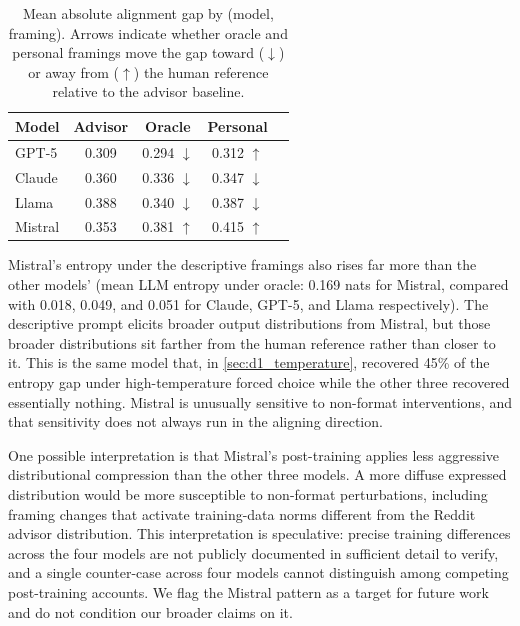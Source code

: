 \begin{table}[t]
  \centering
  \caption{Mean absolute alignment gap by (model, framing). Arrows
    indicate whether oracle and personal framings move the gap toward
    ($\downarrow$) or away from ($\uparrow$) the human reference
    relative to the advisor baseline.}
  \label{tab:d2_per_model}
  \begin{tabular}{lcccc}
    \toprule
    Model   & Advisor & Oracle             & Personal           \\
    \midrule
    GPT-5   & 0.309   & 0.294 $\downarrow$ & 0.312 $\uparrow$   \\
    Claude  & 0.360   & 0.336 $\downarrow$ & 0.347 $\downarrow$ \\
    Llama   & 0.388   & 0.340 $\downarrow$ & 0.387 $\downarrow$ \\
    Mistral & 0.353   & 0.381 $\uparrow$   & 0.415 $\uparrow$   \\
    \bottomrule
  \end{tabular}
\end{table}

Mistral's entropy under the descriptive framings also rises far more
than the other models' (mean LLM entropy under oracle: 0.169 nats for
Mistral, compared with 0.018, 0.049, and 0.051 for Claude, GPT-5, and
Llama respectively). The descriptive prompt elicits broader output
distributions from Mistral, but those broader distributions sit farther
from the human reference rather than closer to it. This is the same
model that, in \cref{sec:d1_temperature}, recovered 45\% of the entropy
gap under high-temperature forced choice while the other three recovered
essentially nothing. Mistral is unusually sensitive to non-format
interventions, and that sensitivity does not always run in the aligning
direction.

One possible interpretation is that Mistral's post-training applies less
aggressive distributional compression than the other three models. A more
diffuse expressed distribution would be more susceptible to non-format
perturbations, including framing changes that activate
training-data norms different from the Reddit advisor distribution. This
interpretation is speculative: precise training differences across the
four models are not publicly documented in sufficient detail to verify,
and a single counter-case across four models cannot distinguish among
competing post-training accounts. We flag the Mistral pattern as a
target for future work and do not condition our broader claims on it.

